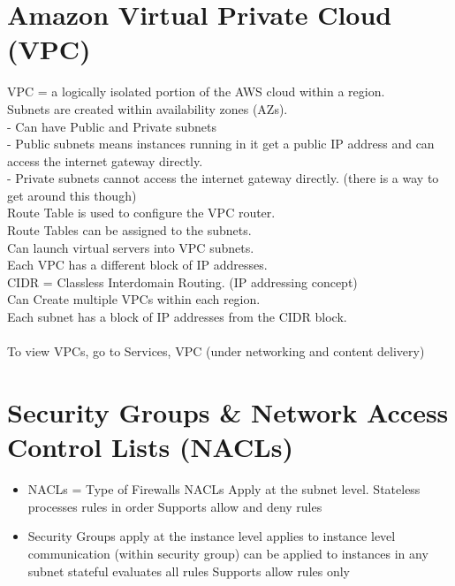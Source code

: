 \documentclass[11pt]{article}
\begin{document}
    \section{Amazon Virtual Private Cloud (VPC)}
    VPC = a logically isolated portion of the AWS cloud within a region.
    \\
    Subnets are created within availability zones (AZs).
    \\
     - Can have Public and Private subnets
    \\
     - Public subnets means instances running in it get a public IP address and can access the internet gateway directly.
    \\
     - Private subnets cannot access the internet gateway directly.
    (there is a way to get around this though)
    \\
    Route Table is used to configure the VPC router.
    \\
    Route Tables can be assigned to the subnets.
    \\
    Can launch virtual servers into VPC subnets.
    \\
    Each VPC has a different block of IP addresses.
    \\
    CIDR = Classless Interdomain Routing.
    (IP addressing concept)
    \\
    Can Create multiple VPCs within each region.
    \\
    Each subnet has a block of IP addresses from the CIDR block.
    \\\\
    To view VPCs, go to Services, VPC (under networking and content delivery)

    \section[NACLs]{Security Groups \& Network Access Control Lists (NACLs)}
    \begin{itemize}
        \item NACLs = Type of Firewalls
        \subitem NACLs Apply at the subnet level.
        \subitem Stateless
        \subitem processes rules in order
        \subitem Supports allow and deny rules

        \item Security Groups apply at the instance level
        \subitem applies to instance level communication (within security group)
        \subitem can be applied to instances in any subnet
        \subitem stateful
        \subitem evaluates all rules
        \subitem Supports allow rules only
    \end{itemize}
\end{document}
